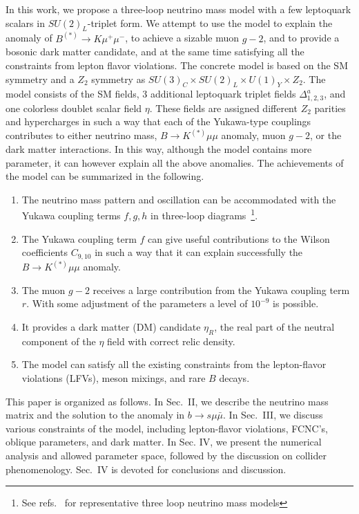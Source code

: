 \documentclass[%
showkeys,12pt,
preprint,preprintnumbers,nofootinbib,
groupedaddress,superscriptaddress,amsmath,amssymb]{revtex4}
\numberwithin{equation}{section}
\begin{document}
In this work, we propose a three-loop neutrino mass model with a 
few leptoquark scalars in $SU(2)_L$-triplet form.
We attempt to use the model to explain the anomaly 
of $B^{(*)}\to K\mu^+\mu^-$, to achieve a sizable muon $g-2$, and 
to provide a bosonic dark matter candidate, and at the same time 
satisfying all the constraints from lepton flavor violations.
The concrete model is based on the SM symmetry and a $Z_2$ symmetry as 
$SU(3)_C \times SU(2)_L \times U(1)_Y \times Z_2$. The model consists 
of the SM fields, 3 additional leptoquark triplet fields $\Delta_{1,2,3}^a$, 
and one colorless doublet scalar field $\eta$.  These fields are assigned
different $Z_2$ {parities} and hypercharges in such a way that 
each of the Yukawa-type couplings contributes to either neutrino mass, 
$B \to K^{(*)}\mu\mu$ anomaly, muon $g-2$, or the dark matter interactions.
In this way, although the model contains more parameter, it can however 
explain all the above anomalies. The achievements of the model can be
summarized in the following.
\begin{enumerate}
\item
 The neutrino mass pattern and oscillation can be accommodated with the
Yukawa coupling terms $f,g,h$ in three-loop diagrams~\footnote{See refs.~\cite{Krauss:2002px, Aoki:2008av, Gustafsson:2012vj} for representative three loop neutrino mass models}.

\item 
The Yukawa coupling term $f$ can give useful contributions to the Wilson
coefficients $C_{9,10}$ in such a way that it can explain successfully
the $B\to K^{(*)}\mu\mu$ anomaly.

\item
 The muon $g-2$ receives a large contribution from the Yukawa coupling term 
$r$. With some adjustment of the parameters a level of $10^{-9}$ is 
possible.

\item
 It provides a dark matter (DM) candidate $\eta_R$, the real part of the 
neutral component of the $\eta$ field with correct relic density.

\item
 The model can satisfy all the existing constraints from the lepton-flavor
violations (LFVs), meson mixings, and rare $B$ decays.
\end{enumerate}

This paper is organized as follows.
%
In Sec.~II, we describe the neutrino mass matrix
and the solution to the anomaly in $b\to s \mu \bar \mu$.
%
In Sec.~III, we discuss various constraints of the model, including
lepton-flavor violations, FCNC's, oblique parameters, and dark matter. 
%
In Sec. IV, we present the numerical analysis and allowed parameter space,
followed by the discussion on collider phenomenology.
%
Sec.~IV is devoted for conclusions and discussion.
\end{document}
